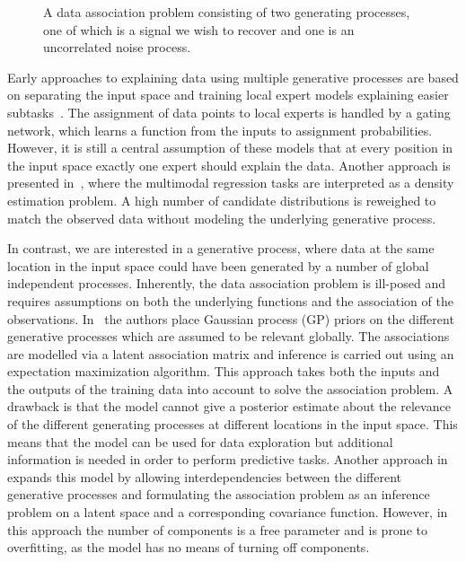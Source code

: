 \begin{figure}[t]
    \centering
    
    \caption{
        \label{fig:data_association:choicenet_data}
        A data association problem consisting of two generating processes, one of which is a signal we wish to recover and one is an uncorrelated noise process.
    }
\end{figure}
Early approaches to explaining data using multiple generative processes are based on separating the input space and training local expert models explaining easier subtasks~\parencite{jacobs_adaptive_1991,tresp_mixtures_2001, rasmussen_infinite_2002}.
The assignment of data points to local experts is handled by a gating network, which learns a function from the inputs to assignment probabilities.
However, it is still a central assumption of these models that at every position in the input space exactly one expert should explain the data.
Another approach is presented in~\parencite{bishop_mixture_1994}, where the multimodal regression tasks are interpreted as a density estimation problem.
A high number of candidate distributions is reweighed to match the observed data without modeling the underlying generative process.

In contrast, we are interested in a generative process, where data at the same location in the input space could have been generated by a number of global independent processes.
Inherently, the data association problem is ill-posed and requires assumptions on both the underlying functions and the association of the observations.
In~\parencite{lazaro-gredilla_overlapping_2012} the authors place Gaussian process (GP) priors on the different generative processes which are assumed to be relevant globally.
The associations are modelled via a latent association matrix and inference is carried out using an expectation maximization algorithm.
This approach takes both the inputs and the outputs of the training data into account to solve the association problem.
A drawback is that the model cannot give a posterior estimate about the relevance of the different generating processes at different locations in the input space.
This means that the model can be used for data exploration but additional information is needed in order to perform predictive tasks.
Another approach in~\parencite{bodin_latent_2017} expands this model by allowing interdependencies between the different generative processes and formulating the association problem as an inference problem on a latent space and a corresponding covariance function.
However, in this approach the number of components is a free parameter and is prone to overfitting, as the model has no means of turning off components.


